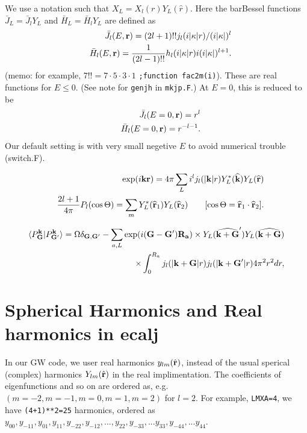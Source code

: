 \documentclass[a4paper,10pt,epsf,fleqn]{article}
\newcommand{\bfr}{{\bf r}}
\begin{document}
We use a notation such that $X_L=X_l(r) Y_L(\hat{r})$.
Here the barBessel functions $
\bar{J}_L=\bar{J}_lY_L$ and $\bar{H}_L=\bar{H}_lY_L$ are defined as
\begin{eqnarray}
&&\bar{J}_l(E,\bfr)=(2l+1)!! j_l(i|\kappa| r) / (i |\kappa|)^l \nonumber \\
&&\bar{H}_l(E,\bfr)=\frac{1}{(2l-1)!!} h_l(i|\kappa| r) i (i |\kappa|)^{l+1} . \label{eq:Fbessel}
\end{eqnarray}
(memo: for example, $7!!=7\cdot5\cdot3\cdot1$ \verb!;function fac2m(i)!).
These are real functions for $E\le 0$.
(See note for \verb!genjh! in \verb!mkjp.F!.)
At $E=0$, this is reduced to be 
\begin{eqnarray}
&&\bar{J}_l(E=0,\bfr)=r^l \\
&&\bar{H}_l(E=0,\bfr)=r^{-l-1}.
\end{eqnarray}
Our default setting is with very small negetive $E$ to avoid numerical 
trouble (switch.F).

\begin{eqnarray}
&&\exp( i {\bf k} {\bf r}) = 4 \pi \sum_L i^l 
j_l(|{\bf k}|r)  Y^*_L( {\bf \widehat{ k} }) Y_L(\widehat{{\bf r}}) 
\label{eq:expandpw}\\
&&\frac{2l+1}{4 \pi} P_l(\cos\Theta) = \sum_m Y^*_L( {\bf \widehat{r}}_1) 
Y_L({\bf \widehat{r}}_2) \ \ \ \ \ \ 
[\cos \Theta = {\bf \widehat{r}}_1 \cdot {\bf \widehat{r}}_2].
\end{eqnarray}

\begin{eqnarray}
\langle P^{\bf k}_{\bf G}|P^{\bf k}_{{\bf G}'} \rangle
= \Omega \delta_{{\bf G},{\bf G}'} -  
\sum_{a,L} \exp( i ({\bf G}-{\bf G}') {\bf R_a}) \times Y_L(\widehat{{\bf k+G}}') 
Y_L( {\bf \widehat{ k+G} }) \nonumber \\
\times \int_0^{R_a} j_l(|{\bf k+G}|r)j_l(|{\bf k+G}'|r) 4 \pi^2 r^2 dr,
\end{eqnarray}

\section{Spherical Harmonics and Real harmonics in ecalj}

In our GW code, we user real harmonics $y_{lm}(\hat{\bf r})$,
instead of the usual sperical (complex) harmonics $Y_{lm}(\hat{\bf r})$
in the real implimentation.
The coefficients of eigenfunctions and so on are ordered as, e.g.
$(m=-2, m=-1, m=0, m=1,m=2)$ for $l=2$.
For example, \verb#LMXA=4#, we have \verb#(4+1)**2=25# harmonics,
ordered as
$y_{00},y_{-11},y_{01},y_{11},y_{-22},y_{-12},... ,y_{22},y_{-33},...y_{33},
y_{-44},...y_{44}$.
\end{document}
